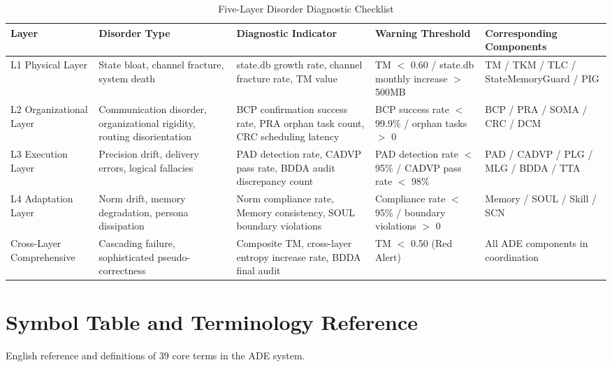 \documentclass[11pt,a4paper]{article}
\begin{document}
\begin{table}[htbp]
\centering
\caption{Five-Layer Disorder Diagnostic Checklist}
\label{tab:disorder-checklist}
\footnotesize
\begin{tabular}{p{}p{}p{}p{}p{}}
\hline
\textbf{Layer} & \textbf{Disorder Type} & \textbf{Diagnostic Indicator} & \textbf{Warning Threshold} & \textbf{Corresponding Components} \\
\hline
L1 Physical Layer & State bloat, channel fracture, system death & state.db growth rate, channel fracture rate, TM value & TM $<$ 0.60 / state.db monthly increase $>$ 500MB & TM / TKM / TLC / StateMemoryGuard / PIG \\
L2 Organizational Layer & Communication disorder, organizational rigidity, routing disorientation & BCP confirmation success rate, PRA orphan task count, CRC scheduling latency & BCP success rate $<$ 99.9\% / orphan tasks $>$ 0 & BCP / PRA / SOMA / CRC / DCM \\
L3 Execution Layer & Precision drift, delivery errors, logical fallacies & PAD detection rate, CADVP pass rate, BDDA audit discrepancy count & PAD detection rate $<$ 95\% / CADVP pass rate $<$ 98\% & PAD / CADVP / PLG / MLG / BDDA / TTA \\
L4 Adaptation Layer & Norm drift, memory degradation, persona dissipation & Norm compliance rate, Memory consistency, SOUL boundary violations & Compliance rate $<$ 95\% / boundary violations $>$ 0 & Memory / SOUL / Skill / SCN \\
\hline
Cross-Layer Comprehensive & Cascading failure, sophisticated pseudo-correctness & Composite TM, cross-layer entropy increase rate, BDDA final audit & TM $<$ 0.50 (Red Alert) & All ADE components in coordination \\
\hline
\end{tabular}
\end{table}

\section{Symbol Table and Terminology Reference}
\label{app:C}

English reference and definitions of 39 core terms in the ADE system.
\end{document}
